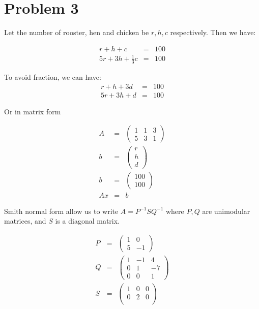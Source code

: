 \documentclass{article}
\begin{document}
\section*{Problem 3}
Let the number of rooster, hen and chicken be $ r, h, c $ respectively. Then we have:

\begin{eqnarray*}
  r + h + c &=& 100 \\
  5r + 3h + \frac{1}{3}c &=& 100
\end{eqnarray*}

To avoid fraction, we can have:
\begin{eqnarray*}
  r + h + 3d &=& 100 \\
  5r + 3h + d &=& 100
\end{eqnarray*}

Or in matrix form 

\begin{eqnarray*}
  A &=& \left(
  \begin{array}{ccc}
    1 & 1 & 3 \\
    5 & 3 & 1 
  \end{array}\right) \\
  b &=& \left(\begin{array}{c}
    r \\
    h \\
    d
  \end{array}\right) \\
  b &=& \left(\begin{array}{c}
    100 \\
    100
  \end{array}\right) \\
  Ax &=& b
\end{eqnarray*}

Smith normal form allow us to write $ A = P^{-1} S Q^{-1} $ where $ P, Q $ are unimodular matrices, and $ S $ is a diagonal matrix.

\begin{eqnarray*}
  P &=& \left(
  \begin{array}{cc}
    1 & 0 \\
    5 & -1
  \end{array}\right) \\
  Q &=& \left(
  \begin{array}{ccc}
    1 & -1 & 4 \\
    0 & 1 & -7 \\
    0 & 0 & 1
  \end{array}\right) \\
  S &=& \left(
  \begin{array}{ccc}
    1 & 0 & 0 \\
    0 & 2 & 0 \\
  \end{array}\right) \\
\end{eqnarray*}
\end{document}
